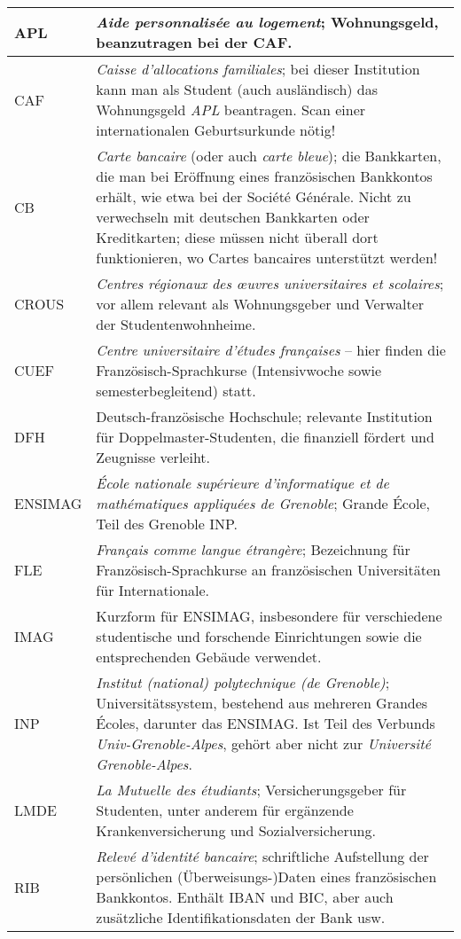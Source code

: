 \documentclass[11pt,a4paper]{article}
\begin{document}
	\noindent \begin{tabularx}{\columnwidth}{|l|X|}
		\hline
		APL & \emph{Aide personnalisée au logement}; Wohnungsgeld, beanzutragen bei der CAF. \\ \hline
		CAF & \emph{Caisse d’allocations familiales}; bei dieser Institution kann man als Student (auch ausländisch) das Wohnungsgeld \emph{APL} beantragen. Scan einer internationalen Geburtsurkunde nötig! \\ \hline
		CB & \emph{Carte bancaire} (oder auch \emph{carte bleue}); die Bankkarten, die man bei Eröffnung eines französischen Bankkontos erhält, wie etwa bei der Société Générale. Nicht zu verwechseln mit deutschen Bankkarten oder Kreditkarten; diese müssen nicht überall dort funktionieren, wo Cartes bancaires unterstützt werden! \\ \hline
		CROUS & \emph{Centres régionaux des œuvres universitaires et scolaires}; vor allem relevant als Wohnungsgeber und Verwalter der Studentenwohnheime. \\ \hline
		CUEF & \emph{Centre universitaire d'études françaises} -- hier finden die Französisch-Sprachkurse (Intensivwoche sowie semesterbegleitend) statt. \\ \hline
		DFH & Deutsch-französische Hochschule; relevante Institution für Doppelmaster-Studenten, die finanziell fördert und Zeugnisse verleiht. \\ \hline
		ENSIMAG & \emph{École nationale supérieure d'informatique et de mathématiques appliquées de Grenoble}; Grande École, Teil des Grenoble INP. \\ \hline
		FLE & \emph{Français comme langue étrangère}; Bezeichnung für Französisch-Sprachkurse an französischen Universitäten für Internationale. \\ \hline
		IMAG & Kurzform für ENSIMAG, insbesondere für verschiedene studentische und forschende Einrichtungen sowie die entsprechenden Gebäude verwendet. \\ \hline
		INP & \emph{Institut (national) polytechnique (de Grenoble)}; Universitätssystem, bestehend aus mehreren Grandes Écoles, darunter das ENSIMAG. Ist Teil des Verbunds \emph{Univ-Grenoble-Alpes}, gehört aber nicht zur \emph{Université Grenoble-Alpes}. \\ \hline
		LMDE & \emph{La Mutuelle des étudiants}; Versicherungsgeber für Studenten, unter anderem für ergänzende Krankenversicherung und Sozialversicherung.\\ \hline
		RIB & \emph{Relevé d'identité bancaire}; schriftliche Aufstellung der persönlichen (Überweisungs-)Daten eines französischen Bankkontos. Enthält IBAN und BIC, aber auch zusätzliche Identifikationsdaten der Bank usw.\\ \hline

\end{tabularx}
\end{document}
